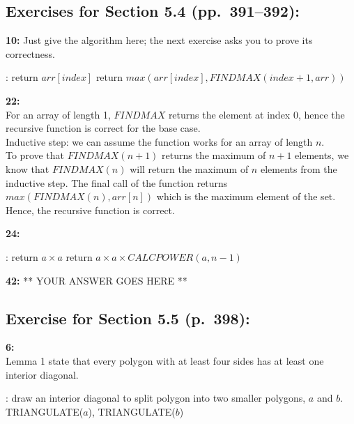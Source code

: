 \documentclass[12pt]{article}  %
\begin{document}

\subsection*{Exercises for Section 5.4 (pp.\ 391--392):}

\noindent
{\bf 10:}  Just give the algorithm here; the next exercise asks you to
prove its correctness.
\\
\begin{algorithmic}
      :
                  \State return $arr[index]$
            \EndIf
            \State return $max(arr[index], FINDMAX(index + 1, arr))$
      \EndFunction
\end{algorithmic}

\noindent
{\bf 22:}
\\
For an array of length 1, $FINDMAX$ returns the element at index 0, hence
the recursive function is correct for the base case.
\\
Inductive step: we can assume the function works for an array of length $n$.
\\
To prove that $FINDMAX(n+1)$ returns the maximum of $n + 1$ elements, we know that
$FINDMAX(n)$ will return the maximum of $n$ elements from the inductive 
step. The final call of the function returns $max(FINDMAX(n), arr[n])$ which 
is the maximum element of the set. Hence, the recursive function is correct.

\noindent
{\bf 24:} 
\\
\begin{algorithmic}
      :
                  \State return $a \times a$
            \EndIf
            \State return $a \times a \times CALCPOWER(a, n - 1)$
      \EndFunction
\end{algorithmic}

\noindent
{\bf 42:} 
** YOUR ANSWER GOES HERE **


\subsection*{Exercise for Section 5.5 (p.\ 398):}

\noindent
{\bf 6:} 
\\
Lemma 1 state that every polygon with at least four sides has at least one 
interior diagonal.
\\
\begin{algorithmic}
      :
                  \State draw an interior diagonal to split
                  polygon into two smaller polygons, $a$ and $b$.
                  TRIANGULATE($a$), TRIANGULATE($b$)
            \EndIf
      \EndFunction
\end{algorithmic}
\end{document}
